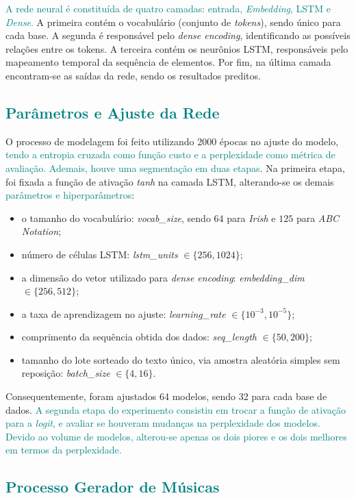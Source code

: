 \documentclass{automatextcc}
\newcommand{\nico}[1]{\textcolor{teal}{#1}}
\begin{document}
\nico{ %
A rede neural é constituída de quatro camadas: entrada, \textit{Embedding}, LSTM e \textit{Dense}.} A primeira contém o vocabulário (conjunto de \textit{tokens}), sendo único para cada base. A segunda é responsável pelo \textit{dense encoding}, identificando as possíveis relações entre os tokens. A terceira contém os neurônios LSTM, responsáveis pelo mapeamento temporal da sequência de elementos. Por fim, na última camada encontram-se as saídas da rede, sendo os resultados preditos.

\subsection{\nico{Parâmetros e Ajuste da Rede}}
O processo de modelagem foi feito utilizando 2000 épocas no ajuste do modelo, \nico{tendo a entropia cruzada como função custo e a perplexidade como métrica de avaliação. Ademais, houve uma segmentação em duas etapas}. Na primeira etapa, foi fixada a função de ativação \textit{tanh} na camada LSTM, alterando-se os demais \nico{parâmetros e hiperparâmetros}: 
\begin{itemize}
    \item o tamanho do vocabulário: \textit{vocab\_size}, sendo $64$ para \textit{Irish} e $125$ para \textit{ABC Notation};
    \item número de células LSTM: \textit{lstm\_units} $\in \{256,1024\}$;
    \item a dimensão do vetor utilizado para \textit{dense encoding}: \textit{embedding\_dim} $\in \{256,512\}$;
    \item a taxa de aprendizagem no ajuste: \textit{learning\_rate} $\in \{10^{-3},10^{-5}\}$;
    \item comprimento da sequência obtida dos dados: \textit{seq\_length} $\in \{50,200\}$;
    \item tamanho do lote sorteado do texto único, via amostra aleatória simples sem reposição: \textit{batch\_size} $\in \{4,16\}$.
\end{itemize}
Consequentemente, foram ajustados 64 modelos, sendo 32 para cada base de dados. \nico{A segunda etapa do experimento consistiu em trocar a função de ativação para a \textit{logit}, e avaliar se houveram mudanças na perplexidade dos modelos. Devido ao volume de modelos, alterou-se apenas os dois piores e os dois melhores em termos da perplexidade.}

\subsection{\nico{Processo Gerador de Músicas}}
\end{document}
